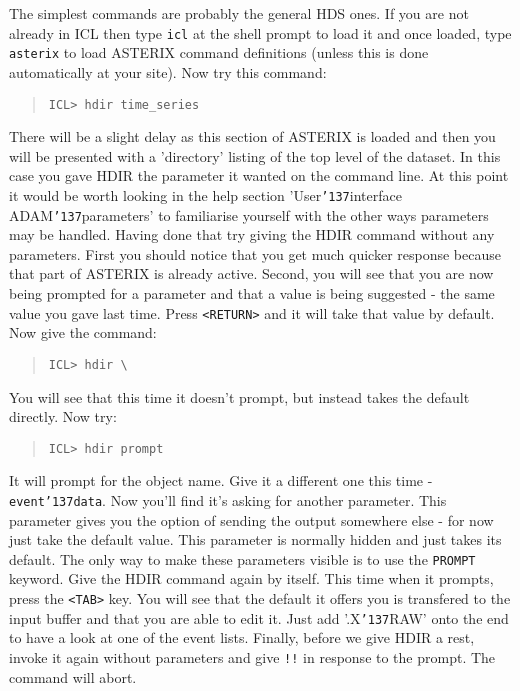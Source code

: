 \documentclass{book}
\renewcommand{\_}{{\tt\char'137}}     %
\begin{document}
The simplest commands are probably the general HDS ones. If you are
not already in ICL then type {\tt icl} at the shell prompt to load it
and once loaded, type
{\tt asterix} to load ASTERIX command definitions (unless this is done
automatically at your site). Now try this command:
 
\begin{quote}\begin{verbatim}
ICL> hdir time_series
\end{verbatim}\end{quote}
There will be a slight delay as this section of ASTERIX is loaded and
then you will be presented with a 'directory' listing of the top level
of the dataset. In this case you gave HDIR the parameter it wanted on
the command line. At this point it would be worth looking in the help
section 'User\_interface ADAM\_parameters' to familiarise yourself with
the other ways parameters may be handled. Having done that try giving
the HDIR command without any parameters. First you should notice that
you get much quicker response because that part of ASTERIX is already
active. Second, you will see that you are now being prompted for a
parameter and that a value is being suggested - the same value you
gave last time. Press \verb+<RETURN>+ and it will take that value by default.
Now give the command:
 
\begin{quote}\begin{verbatim}
ICL> hdir \
\end{verbatim}\end{quote}
You will see that this time it doesn't prompt, but instead takes the
default directly. Now try:
 
\begin{quote}\begin{verbatim}
ICL> hdir prompt
\end{verbatim}\end{quote}
It will prompt for the object name. Give it a different one this time -
{\tt event\_data}. Now you'll find it's asking for another parameter. This
parameter gives you the option of sending the output somewhere else -
for now just take the default value. This parameter is normally hidden
and just takes its default. The only way to make these parameters
visible is to use the {\tt PROMPT} keyword. Give the HDIR command again by
itself. This time when it prompts, press the \verb+<TAB>+ key. You will see
that the default it offers you is transfered to the input buffer and
that you are able to edit it. Just add '.X\_RAW' onto the end to have
a look at one of the event lists. Finally, before we give HDIR a rest,
invoke it again without parameters and give {\tt !!} in response to the
prompt. The command will abort.
 
\end{document}
